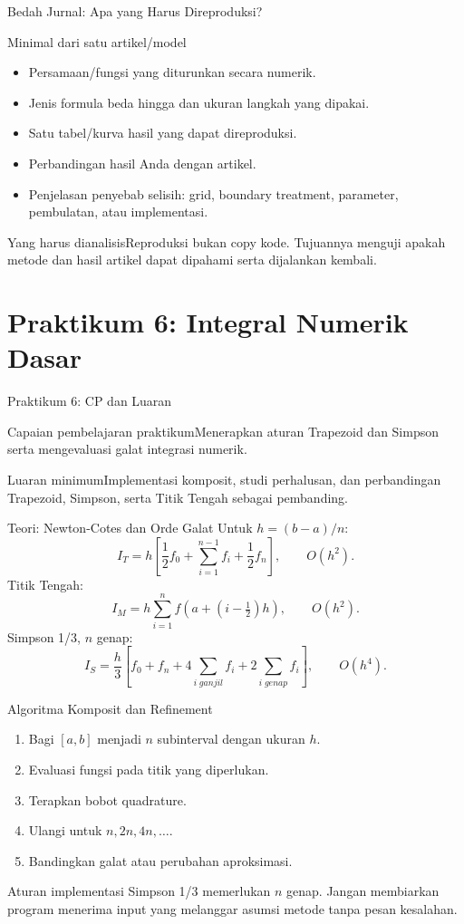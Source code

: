 \documentclass[slides,english,noindex,lean,nobackpage,nocopyright,noupdate,nosummary]{enacom}
\newcommand{\CPBox}[1]{\begin{block}{Capaian pembelajaran praktikum}#1\end{block}}
\newcommand{\OutBox}[1]{\begin{exampleblock}{Luaran minimum}#1\end{exampleblock}}
\newcommand{\AnalysisBox}[1]{\begin{alertblock}{Yang harus dianalisis}#1\end{alertblock}}
\begin{document}
\begin{frame}{Bedah Jurnal: Apa yang Harus Direproduksi?}
\begin{block}{Minimal dari satu artikel/model}
\begin{itemize}
\item Persamaan/fungsi yang diturunkan secara numerik.
\item Jenis formula beda hingga dan ukuran langkah yang dipakai.
\item Satu tabel/kurva hasil yang dapat direproduksi.
\item Perbandingan hasil Anda dengan artikel.
\item Penjelasan penyebab selisih: grid, boundary treatment, parameter, pembulatan, atau implementasi.
\end{itemize}
\end{block}
\AnalysisBox{Reproduksi bukan copy kode. Tujuannya menguji apakah metode dan hasil artikel dapat dipahami serta dijalankan kembali.}
\end{frame}

\section{Praktikum 6: Integral Numerik Dasar}

\begin{frame}{Praktikum 6: CP dan Luaran}
\CPBox{Menerapkan aturan Trapezoid dan Simpson serta mengevaluasi galat integrasi numerik.}
\OutBox{Implementasi komposit, studi perhalusan, dan perbandingan Trapezoid, Simpson, serta Titik Tengah sebagai pembanding.}
\end{frame}

\begin{frame}{Teori: Newton-Cotes dan Orde Galat}
Untuk $h=(b-a)/n$:
\[
I_T=h\left[\frac12f_0+\sum_{i=1}^{n-1}f_i+\frac12f_n\right],\qquad O(h^2).
\]
Titik Tengah:
\[
I_M=h\sum_{i=1}^{n}f\left(a+\left(i-\tfrac12\right)h\right),\qquad O(h^2).
\]
Simpson 1/3, $n$ genap:
\[
I_S=\frac h3\left[f_0+f_n+4\sum_{i\;ganjil}f_i+2\sum_{i\;genap}f_i\right],\qquad O(h^4).
\]
\end{frame}

\begin{frame}{Algoritma Komposit dan Refinement}
\begin{enumerate}
\item Bagi $[a,b]$ menjadi $n$ subinterval dengan ukuran $h$.
\item Evaluasi fungsi pada titik yang diperlukan.
\item Terapkan bobot quadrature.
\item Ulangi untuk $n,2n,4n,\ldots$.
\item Bandingkan galat atau perubahan aproksimasi.
\end{enumerate}
\begin{alertblock}{Aturan implementasi}
Simpson 1/3 memerlukan $n$ genap. Jangan membiarkan program menerima input yang melanggar asumsi metode tanpa pesan kesalahan.
\end{alertblock}
\end{frame}
\end{document}
